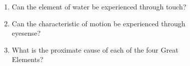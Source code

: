 \documentclass{book}
\begin{document}
\begin{enumerate}
\item Can the element of water be experienced through touch?

\item Can the characteristic of motion be experienced through \\eyesense?

\item What is the proximate cause of each of the four Great \\Elements?
\end{enumerate}



























































































\chapter[The Eight Inseparables]{}  
\end{document}
